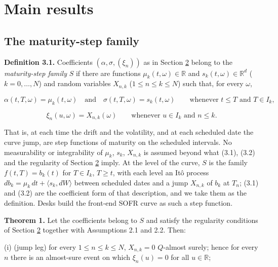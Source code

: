 \documentclass[11pt]{article}
\begin{document}
\section{Main results}\label{sec:3}

\subsection{The maturity-step family}\label{sec:3.1}

\textbf{Definition 3.1.} Coefficients \((\alpha, \sigma, (\xi_n))\) as in Section \hyperref[sec:2]{2} belong to the \emph{maturity-step family} \(S\) if there are functions \(\mu_k(t, \omega) \in \mathbb R\) and \(s_k(t, \omega) \in \mathbb R^d\) (\(k = 0, \dots, N\)) and random variables \(X_{n,k}\) (\(1 \le n \le k \le N\)) such that, for every \(\omega\),

\begin{equation*}
\alpha(t, T, \omega) = \mu_k(t, \omega) \quad \text{and} \quad \sigma(t, T, \omega) = s_k(t, \omega) \qquad \text{whenever } t \le T \text{ and } T \in I_k, \tag{3.1}\label{eq:3.1}
\end{equation*}

\begin{equation*}
\xi_n(u, \omega) = X_{n,k}(\omega) \qquad \text{whenever } u \in I_k \text{ and } n \le k. \tag{3.2}\label{eq:3.2}
\end{equation*}

That is, at each time the drift and the volatility, and at each scheduled date the curve jump, are step functions of maturity on the scheduled intervals. No measurability or integrability of \(\mu_k\), \(s_k\), \(X_{n,k}\) is assumed beyond what (3.1), (3.2) and the regularity of Section \hyperref[sec:2]{2} imply. At the level of the curve, \(S\) is the family \(f(t, T) = b_k(t)\) for \(T \in I_k\), \(T \ge t\), with each level an Itô process \(db_k = \mu_k\,dt + \langle s_k, dW \rangle\) between scheduled dates and a jump \(X_{n,k}\) of \(b_k\) at \(T_n\); (3.1) and (3.2) are the coefficient form of that description, and we take them as the definition. Desks build the front-end SOFR curve as such a step function.

\label{res:Theorem-1}
\textbf{Theorem 1.} Let the coefficients belong to \(S\) and satisfy the regularity conditions of Section \hyperref[sec:2]{2} together with Assumptions 2.1 and 2.2. Then:

(i) (jump leg) for every \(1 \le n \le k \le N\), \(X_{n,k} = 0\) \(Q\)-almost surely; hence for every \(n\) there is an almost-sure event on which \(\xi_n(u) = 0\) for all \(u \in \mathbb R\);
\end{document}
